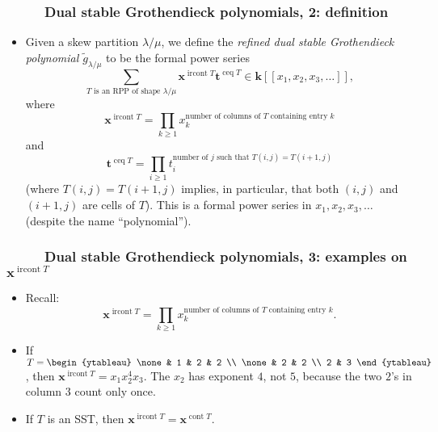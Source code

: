\documentclass{beamer}
\newcommand{\kk}{{\mathbf k}}
\newcommand{\xx}{\mathbf{x}}
\newcommand{\fti}[1]{\frametitle{\ \ \ \ \ #1}}
\newcommand{\defn}[1]{{\color{darkred}\emph{#1}}} %
\theoremstyle{plain}
\newcommand{\0}{\phantom{c}}
\newcommand{\wtg}{\widetilde{g}}
\newcommand{\cont}{\operatorname{cont}}
\newcommand{\ircont}{\operatorname{ircont}}
\newcommand{\ceq}{\operatorname{ceq}}
\newcommand{\ttt}{{\mathbf{t}}}
\let\sumnonlimits\sum
\let\prodnonlimits\prod
\renewcommand{\sum}{\sumnonlimits\limits}
\renewcommand{\prod}{\prodnonlimits\limits}
\begin{document}
\begin{frame}
\fti{Dual stable Grothendieck polynomials, 2: definition}

\begin{itemize}

\item Given a skew partition $\lambda / \mu$, we define the \defn{refined dual stable Grothendieck polynomial $\wtg_{\lambda / \mu}$} to be the formal power series
\[
\sum_{T \text{ is an RPP of shape } \lambda / \mu} \xx^{\ircont T} \ttt^{\ceq T} \in \kk\left[\left[x_1, x_2, x_3, \ldots\right]\right] ,
\]
where
\[
\xx^{\ircont T}
= \prod_{k \geq 1} x_k^{\text{number of columns of } T \text{ containing entry } k}
\]
and
\[
\ttt^{\ceq T}
= \prod_{i \geq 1} t_i^{\text{number of } j \text{ such that } T\left(i, j\right) = T\left(i+1, j\right)}
\]
(where $T\left(i, j\right) = T\left(i+1, j\right)$ implies, in particular, that both $\left(i, j\right)$ and $\left(i+1, j\right)$ are cells of $T$).
\newline
This is a formal power series in $x_1, x_2, x_3, \ldots$ (despite the name ``polynomial'').

\end{itemize}
\vspace{10cm}
\end{frame}

\begin{frame}
\fti{Dual stable Grothendieck polynomials, 3: examples on $\xx^{\ircont T}$}


\begin{itemize}

\item Recall:
\[
\xx^{\ircont T}
= \prod_{k \geq 1} x_k^{\text{number of columns of } T \text{ containing entry } k} .
\]

\item If $T = \begin{ytableau}
\none & 1 & 2 & 2 \\
\none & 2 & 2 \\
2 & 3
\end{ytableau}$, then $\xx^{\ircont T} = x_1 x_2^4 x_3$.
The $x_2$ has exponent $4$, not $5$, because the two $2$'s in column $3$ count only once.

\pause
\item If $T$ is an SST, then $\xx^{\ircont T} = \xx^{\cont T}$.

\end{itemize}
\end{frame}
\end{document}
